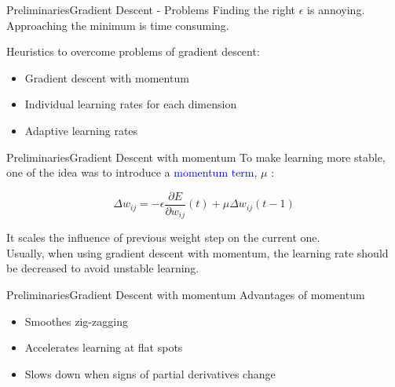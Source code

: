 \documentclass{beamer}
\begin{document}
\begin{frame}{Preliminaries}{Gradient Descent - Problems}
Finding the right $ \epsilon $ is annoying. Approaching the minimum is time consuming.

\vspace{5mm}
Heuristics to overcome problems of gradient descent:

\begin{itemize}
\item Gradient descent with momentum
\item Individual learning rates for each dimension
\item Adaptive learning rates
\end{itemize}

\end{frame}

\begin{frame}{Preliminaries}{Gradient Descent with momentum}
To make learning more stable, one of the idea was to introduce a \textcolor{blue}{momentum term}, $ \mu $ : 

\pause
\begin{equation*}
\Delta w_{ij} = - \epsilon \frac{\partial E}{\partial w_{ij}} (t) + \mu \Delta w_{ij} (t-1) 
\end{equation*}

It scales the influence of previous weight step on the current one. 	\\

\vspace{4mm}	
	Usually, when using gradient descent with momentum, the learning rate should be decreased to avoid unstable learning. 
\end{frame}

\begin{frame}{Preliminaries}{Gradient Descent with momentum}
Advantages of momentum 
\vspace{8mm}
\begin{itemize}
\item Smoothes zig-zagging
\item Accelerates learning at flat spots
\item Slows down when signs of partial derivatives change
\end{itemize}

\end{frame}
\end{document}
